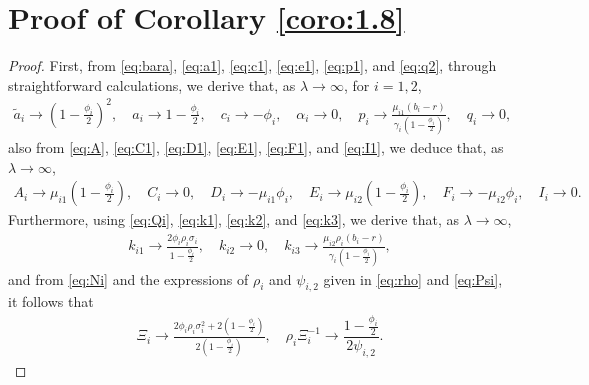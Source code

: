 \documentclass[11pt]{article}
\newcommand \la {\lambda}
\numberwithin{equation}{section}
\renewcommand{\theequation}{\arabic{section}.\arabic{equation}}
\begin{document}
\section{Proof of Corollary \ref{coro:1.8}}\label{app:C}
\setcounter{equation}{0}
	\renewcommand{\theequation}{C.\arabic{equation}}
\begin{proof}
First, from \eqref{eq:bara}, \eqref{eq:a1}, \eqref{eq:c1}, \eqref{eq:e1}, \eqref{eq:p1},  and \eqref{eq:q2}, through straightforward calculations, we derive that, as \(\lambda\to\infty\), for $i=1, 2$,
\begin{align*}
 \tilde{a}_i\to \left(1-\frac{\phi_i}{2}\right)^2, \quad a_i \to 1-\frac{\phi_i}{2}, \quad c_i\to-\phi_i, \quad \alpha_i\to 0,
\quad p_i\to\frac{\mu_{i1}(b_i-r)}{\gamma_i\left(1-\frac{\phi_i}{2}\right)}, \quad q_i\to 0,
\end{align*}
also from \eqref{eq:A}, \eqref{eq:C1}, \eqref{eq:D1}, \eqref{eq:E1}, \eqref{eq:F1}, and \eqref{eq:I1}, we deduce that, as \(\lambda\to\infty\),
\begin{align*}
A_i\to \mu_{i1}\left(1-\frac{\phi_i}{2}\right), \quad C_i\to 0, \quad D_i\to-\mu_{i1}\phi_i, \quad E_i\to \mu_{i2}\left(1-\frac{\phi_i}{2}\right),
\quad F_i\to -\mu_{i2}\phi_i, \quad I_i \to 0.
\end{align*}
Furthermore, using \eqref{eq:Qi}, \eqref{eq:k1},  \eqref{eq:k2}, and \eqref{eq:k3}, we derive that, as $\la \to \infty$,
\begin{align}\label{eq:limit}
k_{i1}\to\frac{2\phi_i\rho_i\sigma_i}{1-\frac{\phi_i}{2}},\quad k_{i2}\to0,\quad k_{i3}\to \frac{\mu_{i2}\rho_i(b_i-r)}{\gamma_i\left(1-\frac{\phi_i}{2}\right)},
\end{align}
and from \eqref{eq:Ni} and the expressions of $\rho_i$ and $\psi_{i,2}$ given in \eqref{eq:rho} and \eqref{eq:Psi}, it follows that
        \begin{align}\label{eq:limN}
        \Xi_i\to\frac{2\phi_i\rho_i\sigma_i^2+2\left(1-\frac{\phi_i}{2}\right)}{2\left(1-\frac{\phi_i}{2}\right)}, \quad
        \rho_i \Xi^{-1}_i \to \dfrac{1-\frac{\phi_i}{2}}{2  \psi_{i,2}}.
        \end{align}


\end{proof}
\end{document}
